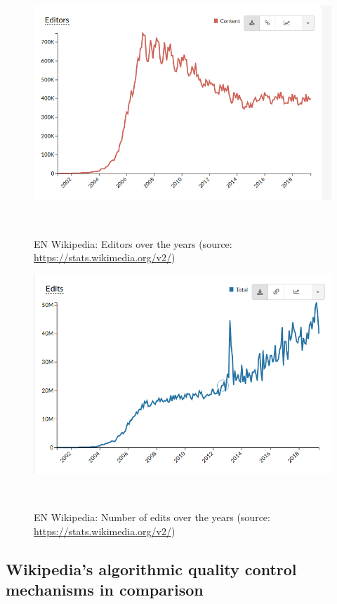\begin{figure}
\centering
  \includegraphics[width=0.9\columnwidth]{pics/editors-development.png}
    \caption{EN Wikipedia: Editors over the years (source: \url{https://stats.wikimedia.org/v2/})}~\label{fig:editors-development}
\end{figure}

\begin{figure}
\centering
    \includegraphics[width=0.9\columnwidth]{pics/edits-development-total.png}
    \caption{EN Wikipedia: Number of edits over the years (source: \url{https://stats.wikimedia.org/v2/})}~\label{fig:edits-development}
\end{figure}

\subsection{Wikipedia's algorithmic quality control mechanisms in comparison}

